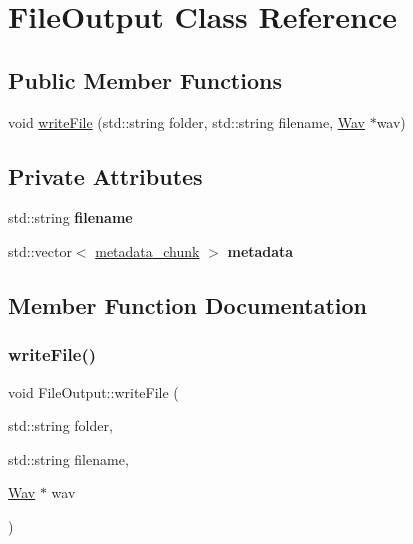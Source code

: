 \hypertarget{classFileOutput}{}\section{File\+Output Class Reference}
\label{classFileOutput}
\subsection*{Public Member Functions}
\begin{DoxyCompactItemize}
\item 
void \hyperlink{classFileOutput_a4f791cbc22ef28e4ad7970a70709f97d}{write\+File} (std\+::string folder, std\+::string filename, \hyperlink{classWav}{Wav} $\ast$wav)
\end{DoxyCompactItemize}
\subsection*{Private Attributes}
\begin{DoxyCompactItemize}
\item 
\mbox{\label{classFileOutput_ac20376e20e45628c65b5cadcba69f25c}} 
std\+::string {\bfseries filename}
\item 
\mbox{\label{classFileOutput_a9a53603e70238db67b8424ee4bc73d6a}} 
std\+::vector$<$ \hyperlink{structmetadata__chunk}{metadata\+\_\+chunk} $>$ {\bfseries metadata}
\end{DoxyCompactItemize}


\subsection{Member Function Documentation}
\mbox{\label{classFileOutput_a4f791cbc22ef28e4ad7970a70709f97d}} 
\subsubsection{\texorpdfstring{write\+File()}{writeFile()}}
{\footnotesize\ttfamily void File\+Output\+::write\+File (\begin{DoxyParamCaption}\item[{std\+::string}]{folder,  }\item[{std\+::string}]{filename,  }\item[{\hyperlink{classWav}{Wav} $\ast$}]{wav }\end{DoxyParamCaption})}

